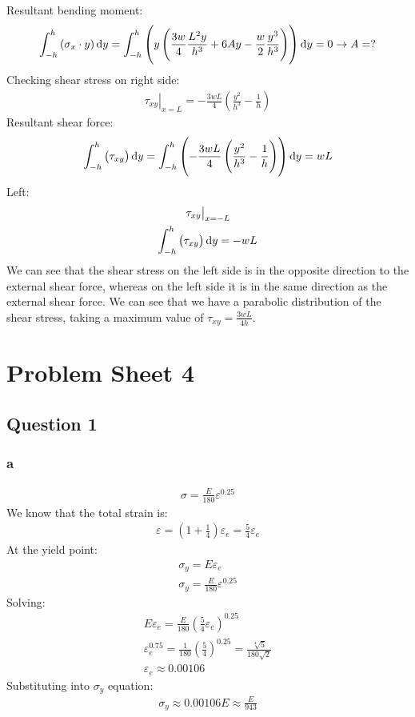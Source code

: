 Resultant bending moment:
\begin{gather}
    \int_{-h}^h \left(\sigma_x \cdot y\right)\dif y = \int_{-h}^h \left(y\left(\frac{3w}{4}\frac{L^2y}{h^3} + 6Ay -\frac{w}{2}\frac{y^3}{h^3}\right)\right)\dif y = 0 \rightarrow A = ?
\end{gather}
Checking shear stress on right side:
\begin{gather}
    \left.\tau_{xy}\right|_{x=L} = -\frac{3wL}{4}\left(\frac{y^2}{h^3} - \frac{1}{h}\right)
\end{gather}
Resultant shear force:
\begin{gather}
    \int_{-h}^h \left(\tau_{xy}\right)\dif y = \int_{-h}^h \left(-\frac{3wL}{4}\left(\frac{y^2}{h^3}-\frac{1}{h}\right)\right)\dif y = wL
\end{gather}
Left:
\begin{gather}
    \left. \tau_{xy} \right|_{x = -L}\\
    \int_{-h}^h \left(\tau_{xy}\right)\dif y = - wL
\end{gather}
We can see that the shear stress on the left side is in the opposite direction to the external shear force, whereas on the left side it is in the same direction as the external shear force. We can see that we have a parabolic distribution of the shear stress, taking a maximum value of $\tau_{xy} = \frac{3wL}{4h}$.
\chapter{Problem Sheet 4}
\section{Question 1}
\subsection{a}
\begin{gather}
    \sigma = \frac{E}{180}\varepsilon^{0.25}
\end{gather}
We know that the total strain is:
\begin{gather}
    \varepsilon = \left(1 + \frac{1}{4}\right)\varepsilon_e = \frac{5}{4}\varepsilon_e
\end{gather}
At the yield point:
\begin{gather}
    \sigma_y = E\varepsilon_e \\
    \sigma_y = \frac{E}{180}\varepsilon^{0.25}
\end{gather}
Solving:
\begin{gather}
    E\varepsilon_e = \frac{E}{180}\left(\frac{5}{4}\varepsilon_e\right)^{0.25}\\
    \varepsilon_e^{0.75} = \frac{1}{180}\left(\frac{5}{4}\right)^{0.25} = \frac{\sqrt[4]{5}}{180\sqrt{2}}\\
    \varepsilon_e \approx 0.00106
\end{gather}
Substituting into $\sigma_y$ equation:
\begin{gather}
    \sigma_y \approx 0.00106 E \approx \frac{E}{943}
\end{gather}
